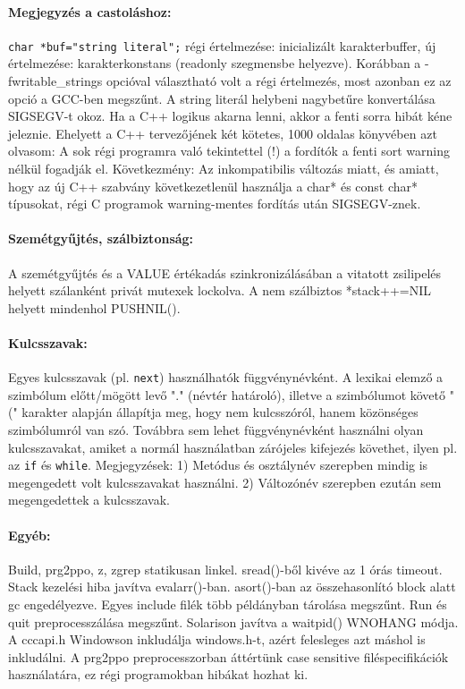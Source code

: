 \begin{description}
  \paragraph{Megjegyzés a castoláshoz:}
        \verb!char *buf="string literal";!
    régi értelmezése: inicializált karakterbuffer,
    új értelmezése: karakterkonstans (readonly szegmensbe helyezve).
    Korábban a -fwritable\_strings opcióval választható volt
    a régi értelmezés, most azonban ez az opció a GCC-ben megszűnt.
    A string literál helybeni nagybetűre konvertálása SIGSEGV-t okoz.
    Ha a C++ logikus akarna lenni, akkor a fenti sorra hibát kéne
    jeleznie. Ehelyett a C++ tervezőjének két kötetes,  1000 oldalas 
    könyvében azt olvasom: A sok régi programra való tekintettel (!) 
    a fordítók a fenti sort warning nélkül fogadják el. Következmény:
    Az inkompatibilis változás miatt, és amiatt, hogy az új C++ szabvány 
    következetlenül használja a char* és const char*  típusokat, régi 
    C programok warning-mentes fordítás után SIGSEGV-znek.
    
  \paragraph{Szemétgyűjtés, szálbiztonság:}
    A szemétgyűjtés és a VALUE értékadás szinkronizálásában
    a vitatott zsilipelés helyett szálanként privát mutexek lockolva.
    A nem szálbiztos *stack++=NIL helyett mindenhol PUSHNIL().
    
  \paragraph{Kulcsszavak:}  
    Egyes kulcsszavak (pl. \verb!next!) használhatók függvénynévként.
    A lexikai elemző a szimbólum előtt/mögött levő "." 
    (névtér határoló), illetve a szimbólumot követő "("
    karakter alapján állapítja meg, hogy nem kulcsszóról,
    hanem közönséges szimbólumról van szó. Továbbra sem
    lehet függvénynévként használni olyan kulcsszavakat,
    amiket a normál használatban zárójeles kifejezés
    követhet, ilyen pl. az \verb!if! és \verb!while!.
    Megjegyzések: 1) Metódus és osztálynév szerepben mindig is
    megengedett volt kulcsszavakat használni. 2) Változónév
    szerepben ezután sem megengedettek a kulcsszavak.

  \paragraph{Egyéb:}
    Build, prg2ppo, z, zgrep statikusan linkel.
    sread()-ből kivéve az 1 órás timeout.
    Stack kezelési hiba javítva evalarr()-ban.
    asort()-ban az összehasonlító block alatt gc engedélyezve.
    Egyes include filék több példányban tárolása megszűnt.
    Run és quit preprocesszálása megszűnt.
    Solarison javítva a waitpid() WNOHANG módja.
    A cccapi.h Windowson inkludálja windows.h-t, 
    azért felesleges azt máshol is inkludálni.
    A prg2ppo preprocesszorban áttértünk case sensitive
    filéspecifikációk használatára, ez régi programokban 
    hibákat hozhat ki.


\end{description}
